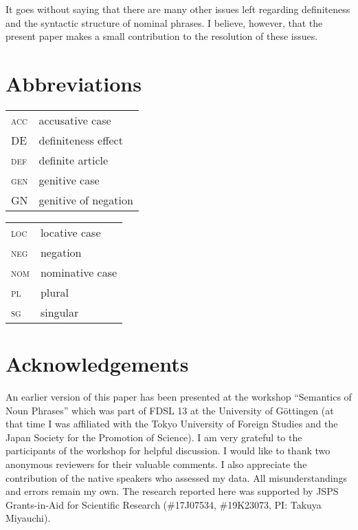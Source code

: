 \documentclass[output=paper]{langscibook}
\begin{document}
It goes without saying that there are many other issues left regarding definiteness and the syntactic structure of  nominal phrases. I believe, however, that the present paper makes a small contribution to the resolution of these issues.

\section*{Abbreviations}
\begin{tabularx}{.5\textwidth}{@{}lX@{}}
\textsc{acc} & accusative case\\
DE & definiteness effect\\
\textsc{def} & definite article\\
\textsc{gen} & genitive case\\
GN & genitive of negation\\
\end{tabularx}%
\begin{tabularx}{.5\textwidth}{@{}lX@{}}
\textsc{loc} & locative case\\
\textsc{neg} & negation\\
\textsc{nom} & nominative case\\
\textsc{pl} & plural\\
\textsc{sg} & singular\\
\end{tabularx}

\section*{Acknowledgements}
An earlier version of this paper has been presented at the workshop ``Semantics of Noun Phrases'' which was part of FDSL 13 at the University of Göttingen (at that time I was affiliated with the Tokyo University of Foreign Studies and the Japan Society for the Promotion of Science). I am very grateful to the participants of the workshop for helpful discussion. I would like to thank two anonymous reviewers for their valuable comments. I also appreciate the contribution of the native speakers who assessed my  data. All misunderstandings and errors remain my own. The research reported here was supported by JSPS Grants-in-Aid for Scientific Research (\#17J07534, \#19K23073, PI: Takuya Miyauchi).

{\sloppy\printbibliography[heading=subbibliography,notkeyword=this]}
\end{document}
